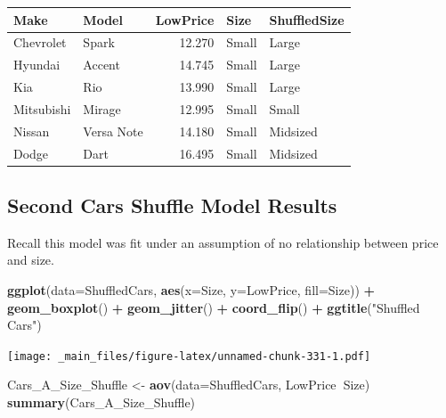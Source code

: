 \documentclass[]{book}
\newenvironment{Shaded}{\begin{snugshade}}{\end{snugshade}}
\newcommand{\KeywordTok}[1]{\textcolor[rgb]{0.13,0.29,0.53}{\textbf{#1}}}
\newcommand{\DataTypeTok}[1]{\textcolor[rgb]{0.13,0.29,0.53}{#1}}
\newcommand{\StringTok}[1]{\textcolor[rgb]{0.31,0.60,0.02}{#1}}
\newcommand{\OperatorTok}[1]{\textcolor[rgb]{0.81,0.36,0.00}{\textbf{#1}}}
\newcommand{\NormalTok}[1]{#1}
\begin{document}
\begin{tabular}{l|l|r|l|l}
\hline
Make & Model & LowPrice & Size & ShuffledSize\\
\hline
Chevrolet & Spark & 12.270 & Small & Large\\
\hline
Hyundai & Accent & 14.745 & Small & Large\\
\hline
Kia & Rio & 13.990 & Small & Large\\
\hline
Mitsubishi & Mirage & 12.995 & Small & Small\\
\hline
Nissan & Versa Note & 14.180 & Small & Midsized\\
\hline
Dodge & Dart & 16.495 & Small & Midsized\\
\hline
\end{tabular}

\subsection{Second Cars Shuffle Model
Results}\label{second-cars-shuffle-model-results-1}

Recall this model was fit under an assumption of no relationship between
price and size.

\begin{Shaded}
\begin{Highlighting}[]
\KeywordTok{ggplot}\NormalTok{(}\DataTypeTok{data=}\NormalTok{ShuffledCars, }\KeywordTok{aes}\NormalTok{(}\DataTypeTok{x=}\NormalTok{Size, }\DataTypeTok{y=}\NormalTok{LowPrice, }\DataTypeTok{fill=}\NormalTok{Size)) }\OperatorTok{+}\StringTok{ }
\StringTok{  }\KeywordTok{geom_boxplot}\NormalTok{() }\OperatorTok{+}\StringTok{ }\KeywordTok{geom_jitter}\NormalTok{() }\OperatorTok{+}\StringTok{ }\KeywordTok{coord_flip}\NormalTok{() }\OperatorTok{+}\StringTok{ }\KeywordTok{ggtitle}\NormalTok{(}\StringTok{"Shuffled Cars"}\NormalTok{)}
\end{Highlighting}
\end{Shaded}

\texttt{[image: \_main\_files/figure-latex/unnamed-chunk-331-1.pdf]}

\begin{Shaded}
\begin{Highlighting}[]
\NormalTok{Cars_A_Size_Shuffle <-}\StringTok{ }\KeywordTok{aov}\NormalTok{(}\DataTypeTok{data=}\NormalTok{ShuffledCars, LowPrice}\OperatorTok{~}\NormalTok{Size)}
\KeywordTok{summary}\NormalTok{(Cars_A_Size_Shuffle)}
\end{Highlighting}
\end{Shaded}
\end{document}
